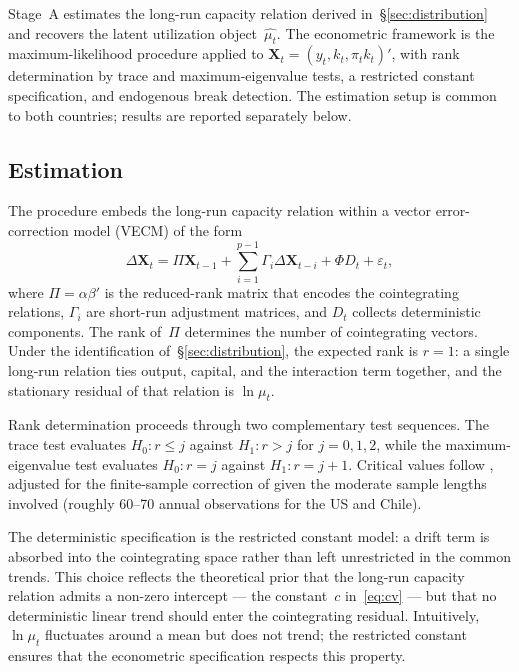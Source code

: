 \documentclass[12pt,letterpaper]{article}
\newcommand{\mut}{\mu_t}           %
\newcommand{\pit}{\pi_t}           %
\begin{document}
Stage~A estimates the long-run capacity relation derived
in~\S\ref{sec:distribution} and recovers the latent utilization
object~$\widehat{\mut}$. The econometric framework is the
\citet{johansen1988} maximum-likelihood procedure applied to
$\mathbf{X}_t = (y_t, k_t, \pit k_t)'$, with rank determination by trace and
maximum-eigenvalue tests, a restricted constant specification, and
\citet{gregoryhansen1996} endogenous break detection. The estimation setup is
common to both countries; results are reported separately below.


\subsection{Estimation}
\label{sec:stageA_est}

The \citet{johansen1988} procedure embeds the long-run capacity relation
within a vector error-correction model (VECM) of the form
\begin{equation}
  \Delta \mathbf{X}_t = \Pi \mathbf{X}_{t-1}
    + \sum_{i=1}^{p-1}\Gamma_i \Delta\mathbf{X}_{t-i}
    + \Phi D_t + \varepsilon_t,
  \label{eq:vecm}
\end{equation}
where $\Pi = \alpha\beta'$ is the reduced-rank matrix that encodes the
cointegrating relations, $\Gamma_i$ are short-run adjustment matrices, and
$D_t$ collects deterministic components. The rank of~$\Pi$ determines the
number of cointegrating vectors. Under the identification
of~\S\ref{sec:distribution}, the expected rank is $r = 1$: a single long-run
relation ties output, capital, and the interaction term together, and the
stationary residual of that relation is $\ln\mut$.

Rank determination proceeds through two complementary test sequences. The
trace test evaluates $H_0\colon r \leq j$ against $H_1\colon r > j$ for
$j = 0, 1, 2$, while the maximum-eigenvalue test evaluates $H_0\colon r = j$
against $H_1\colon r = j+1$. Critical values follow
\citet{johansenjuselius1990}, adjusted for the finite-sample correction of
\citet{reimers1992} given the moderate sample lengths involved (roughly 60--70
annual observations for the US and Chile).

The deterministic specification is the restricted constant model: a drift term
is absorbed into the cointegrating space rather than left unrestricted in the
common trends. This choice reflects the theoretical prior that the long-run
capacity relation admits a non-zero intercept --- the constant~$c$
in~\eqref{eq:cv} --- but that no deterministic linear trend should enter the
cointegrating residual. Intuitively, $\ln\mut$ fluctuates around a mean but
does not trend; the restricted constant ensures that the econometric
specification respects this property.
\end{document}
